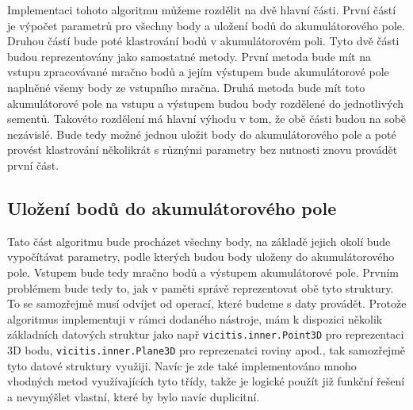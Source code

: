 \documentclass[11pt,twoside,a4paper]{book}
\begin{document}
Implementaci tohoto algoritmu můžeme rozdělit na dvě hlavní části. První částí je výpočet parametrů pro všechny body a uložení bodů do akumulátorového pole. Druhou částí bude poté klastrování bodů v akumulátorovém poli. Tyto dvě části budou reprezentovány jako samostatné metody. První metoda bude mít na vstupu zpracovávané mračno bodů a jejím výstupem bude akumulátorové pole naplněné všemy body ze vstupního mračna. Druhá metoda bude mít toto akumulátorové pole na vstupu a výstupem budou body rozdělené do jednotlivých sementů. Takovéto rozdělení má hlavní výhodu v tom, že obě části budou na sobě nezávislé. Bude tedy možné jednou uložit body do akumulátorového pole a poté provést klastrování několikrát s různými parametry bez nutnosti znovu provádět první část.

\subsection{Uložení bodů do akumulátorového pole}

Tato část algoritmu bude procházet všechny body, na základě jejich okolí bude vypočítávat parametry, podle kterých budou body uloženy do akumulátorového pole. Vstupem bude tedy mračno bodů a výstupem akumulátorové pole. Prvním problémem bude tedy to, jak v paměti správě reprezentovat obě tyto struktury. To se samozřejmě musí odvíjet od operací, které budeme s daty provádět. Protože algoritmus implementuji v rámci dodaného nástroje, mám k dispozici několik základních datových struktur jako např \verb|vicitis.inner.Point3D| pro reprezentaci 3D bodu, \verb|vicitis.inner.Plane3D| pro reprezenatci roviny apod., tak samozřejmě tyto datové struktury využiji. Navíc je zde také implementováno mnoho vhodných metod využívajících tyto třídy, takže je logické použít již funkční řešení a nevymýšlet vlastní, které by bylo navíc duplicitní.
\end{document}
